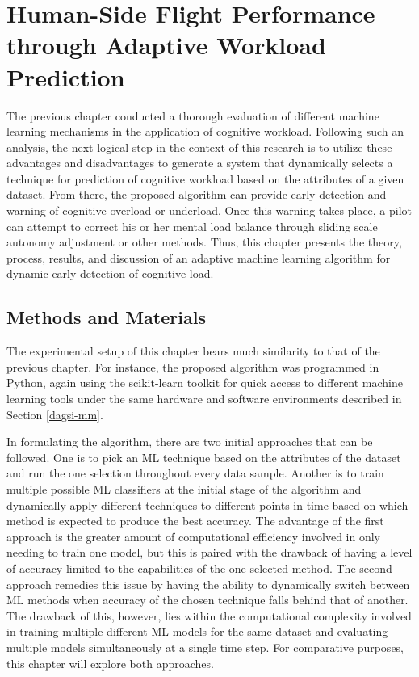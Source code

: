 \documentclass[12pt]{uthesis-v12}  %
\begin{document}
\chapter{Human-Side Flight Performance through Adaptive Workload Prediction}

The previous chapter conducted a thorough evaluation of different machine learning mechanisms in the application of cognitive workload. Following such an analysis, the next logical step in the context of this research is to utilize these advantages and disadvantages to generate a system that dynamically selects a technique for prediction of cognitive workload based on the attributes of a given dataset. From there, the proposed algorithm can provide early detection and warning of cognitive overload or underload. Once this warning takes place, a pilot can attempt to correct his or her mental load balance through sliding scale autonomy adjustment or other methods. Thus, this chapter presents the theory, process, results, and discussion of an adaptive machine learning algorithm for dynamic early detection of cognitive load.

\section{Methods and Materials}

The experimental setup of this chapter bears much similarity to that of the previous chapter. For instance, the proposed algorithm was programmed in Python, again using the scikit-learn toolkit for quick access to different machine learning tools under the same hardware and software environments described in Section \ref{dagsi-mm}.

In formulating the algorithm, there are two initial approaches that can be followed. One is to pick an ML technique based on the attributes of the dataset and run the one selection throughout every data sample. Another is to train multiple possible ML classifiers at the initial stage of the algorithm and dynamically apply different techniques to different points in time based on which method is expected to produce the best accuracy. The advantage of the first approach is the greater amount of computational efficiency involved in only needing to train one model, but this is paired with the drawback of having a level of accuracy limited to the capabilities of the one selected method. The second approach remedies this issue by having the ability to dynamically switch between ML methods when accuracy of the chosen technique falls behind that of another. The drawback of this, however, lies within the computational complexity involved in training multiple different ML models for the same dataset and evaluating multiple models simultaneously at a single time step. For comparative purposes, this chapter will explore both approaches.
\end{document}
